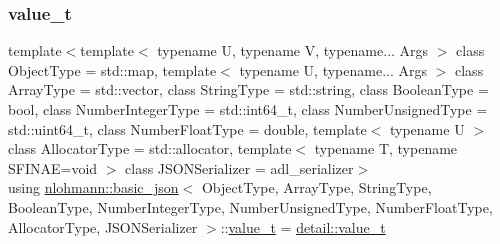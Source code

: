 \subsubsection{\texorpdfstring{value\_t}{value\_t}}
{\footnotesize\ttfamily template$<$template$<$ typename U, typename V, typename... Args $>$ class Object\+Type = std\+::map, template$<$ typename U, typename... Args $>$ class Array\+Type = std\+::vector, class String\+Type  = std\+::string, class Boolean\+Type  = bool, class Number\+Integer\+Type  = std\+::int64\+\_\+t, class Number\+Unsigned\+Type  = std\+::uint64\+\_\+t, class Number\+Float\+Type  = double, template$<$ typename U $>$ class Allocator\+Type = std\+::allocator, template$<$ typename T, typename S\+F\+I\+N\+A\+E=void $>$ class J\+S\+O\+N\+Serializer = adl\+\_\+serializer$>$ \\
using \mbox{\hyperlink{classnlohmann_1_1basic__json}{nlohmann\+::basic\+\_\+json}}$<$ Object\+Type, Array\+Type, String\+Type, Boolean\+Type, Number\+Integer\+Type, Number\+Unsigned\+Type, Number\+Float\+Type, Allocator\+Type, J\+S\+O\+N\+Serializer $>$\+::\mbox{\hyperlink{namespacenlohmann_1_1detail_a90aa5ef615aa8305e9ea20d8a947980f}{value\+\_\+t}} =  \mbox{\hyperlink{namespacenlohmann_1_1detail_a90aa5ef615aa8305e9ea20d8a947980f}{detail\+::value\+\_\+t}}}

\mbox{\label{classnlohmann_1_1basic__json_a2b3297873b70c080837e8eedc4fec32f}} 
